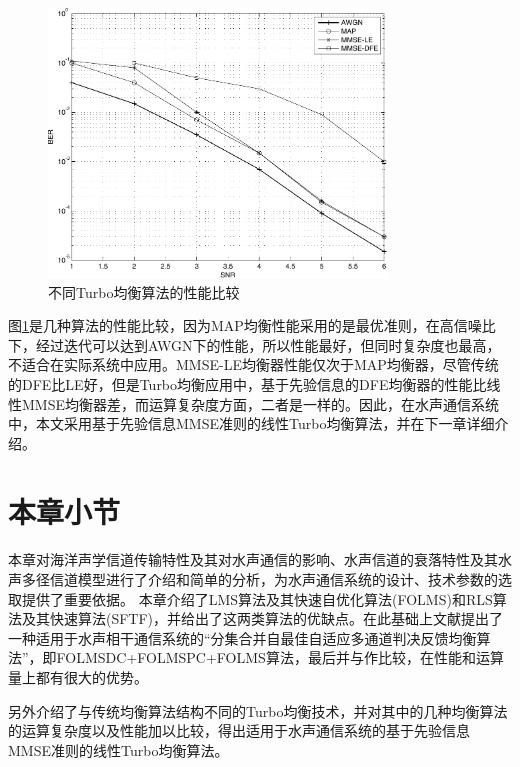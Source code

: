 \begin{figure}[htb]
  \begin{center}
    \includegraphics[width=0.8\textwidth]{images/diffcmp.pdf}
  \end{center}
  \caption{不同Turbo均衡算法的性能比较}
  \label{fig:2.5}
\end{figure}
图\ref{fig:2.5}是几种算法的性能比较，因为MAP均衡性能采用的是最优准则，在高信噪比下，经过迭代可以达到AWGN下的性能，所以性能最好，但同时复杂度也最高，不适合在实际系统中应用。MMSE-LE均衡器性能仅次于MAP均衡器，尽管传统的DFE比LE好，但是Turbo均衡应用中，基于先验信息的DFE均衡器的性能比线性MMSE均衡器差，而运算复杂度方面，二者是一样的。因此，在水声通信系统中，本文采用基于先验信息MMSE准则的线性Turbo均衡算法，并在下一章详细介绍。
\section{本章小节}
本章对海洋声学信道传输特性及其对水声通信的影响、水声信道的衰落特性及其水声多径信道模型进行了介绍和简单的分析，为水声通信系统的设计、技术参数的选取提供了重要依据。
本章介绍了LMS算法及其快速自优化算法(FOLMS)和RLS算法及其快速算法(SFTF)，并给出了这两类算法的优缺点。在此基础上文献提出了一种适用于水声相干通信系统的“分集合并自最佳自适应多通道判决反馈均衡算法”，即FOLMSDC+FOLMSPC+FOLMS算法，最后并与作比较，在性能和运算量上都有很大的优势。

另外介绍了与传统均衡算法结构不同的Turbo均衡技术，并对其中的几种均衡算法的运算复杂度以及性能加以比较，得出适用于水声通信系统的基于先验信息MMSE准则的线性Turbo均衡算法。
%
